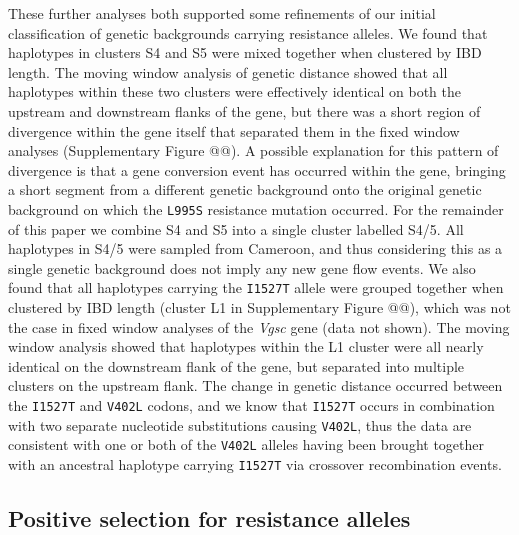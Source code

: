 \documentclass[a4paper,11pt,abstracton,hidelinks]{scrartcl}
\begin{document}
%
These further analyses both supported some refinements of our initial classification of genetic backgrounds carrying resistance alleles.
%
We found that haplotypes in clusters S4 and S5 were mixed together when clustered by IBD length.
%
The moving window analysis of genetic distance showed that all haplotypes within these two clusters were effectively identical on both the upstream and downstream flanks of the gene, but there was a short region of divergence within the gene itself that separated them in the fixed window analyses (Supplementary Figure @@).
%
A possible explanation for this pattern of divergence is that a gene conversion event has occurred within the gene, bringing a short segment from a different genetic background onto the original genetic background on which the \texttt{L995S} resistance mutation occurred.
%
For the remainder of this paper we combine S4 and S5 into a single cluster labelled S4/5.
%
All haplotypes in S4/5 were sampled from Cameroon, and thus considering this as a single genetic background does not imply any new gene flow events.
%
We also found that all haplotypes carrying the \texttt{I1527T} allele were grouped together when clustered by IBD length (cluster L1 in Supplementary Figure @@), which was not the case in fixed window analyses of the \textit{Vgsc} gene (data not shown).
%
The moving window analysis showed that haplotypes within the L1 cluster were all nearly identical on the downstream flank of the gene, but separated into multiple clusters on the upstream flank.
%
The change in genetic distance occurred between the \texttt{I1527T} and \texttt{V402L} codons, and we know that \texttt{I1527T} occurs in combination with two separate nucleotide substitutions causing \texttt{V402L}, thus the data are consistent with one or both of the \texttt{V402L} alleles having been brought together with an ancestral haplotype carrying \texttt{I1527T} via crossover recombination events.
%


\subsection*{Positive selection for resistance alleles}
\end{document}
